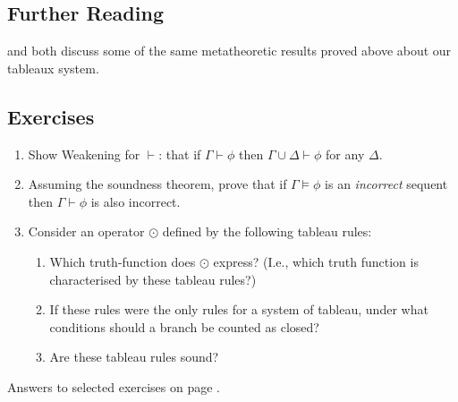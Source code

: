 {\small

\subsection*{Further Reading}
 \citet[ch. 4]{bosintlo} and \citet{jefforlos}  both discuss some of the same metatheoretic results proved above about our tableaux system. 

\subsection*{Exercises} \label{ex6a}

\begin{enumerate}
\item Show Weakening for $\vdash$: that if $\Gamma\vdash \phi$ then $\Gamma\cup \Delta \vdash \phi$ for any $\Delta$.
\item Assuming the  soundness theorem, prove that if $\Gamma \vDash \phi$  is an \emph{incorrect} sequent  then $\Gamma \vdash \phi$ is also incorrect.

\item Consider  an operator $\odot$ defined by the following tableau rules: 
 \begin{center}
 {\leaf{$(\phi \odot \phi)$\\$(\psi \odot \psi)$}\qobitree} \qquad
 {\leaf{$\phi$}\leaf{\quad$\psi$\qquad}\qobitree}\end{center}

\begin{enumerate}
 \item  Which truth-function does $\odot$ express? (I.e., which truth function is characterised by these tableau rules?)
 \item If these rules were the only rules for a system of tableau,
 under what conditions should a branch be counted as closed?
\item Are these tableau rules sound?
 \end{enumerate}
 \end{enumerate}


Answers to selected exercises on page \pageref{ans6a}.
}
